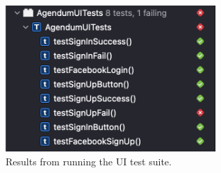 \begin{figure}[H]
    \centering
    \includegraphics[width=8cm]{./graphics/testing/test results.png}
    \caption{Results from running the UI test suite.}
    \label{fig:ui_test_results}
\end{figure}